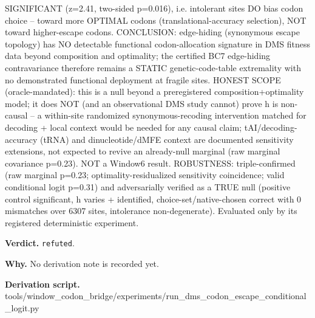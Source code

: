 SIGNIFICANT (z=2.41, two-sided p=0.016), i.e. intolerant sites DO bias codon choice -- toward more
OPTIMAL codons (translational-accuracy selection), NOT toward higher-escape codons. CONCLUSION:
edge-hiding (synonymous escape topology) has NO detectable functional codon-allocation signature in
DMS fitness data beyond composition and optimality; the certified BC7 edge-hiding contravariance
therefore remains a STATIC genetic-code-table extremality with no demonstrated functional deployment
at fragile sites. HONEST SCOPE (oracle-mandated): this is a null beyond a preregistered
composition+optimality model; it does NOT (and an observational DMS study cannot) prove h is
non-causal -- a within-site randomized synonymous-recoding intervention matched for decoding + local
context would be needed for any causal claim; tAI/decoding-accuracy (tRNA) and dinucleotide/dMFE
context are documented sensitivity extensions, not expected to revive an already-null marginal (raw
marginal covariance p=0.23). NOT a Window6 result. ROBUSTNESS: triple-confirmed (raw marginal
p=0.23; optimality-residualized sensitivity coincidence; valid conditional logit p=0.31) and
adversarially verified as a TRUE null (positive control significant, h varies + identified,
choice-set/native-chosen correct with 0 mismatches over 6307 sites, intolerance non-degenerate).
Evaluated only by its registered deterministic experiment.

\textbf{Verdict.} \texttt{refuted}.

\textbf{Why.} No derivation note is recorded yet.

\textbf{Derivation script.} tools/window\_codon\_bridge/experiments/run\_dms\_codon\_escape\_conditional\_logit.py

